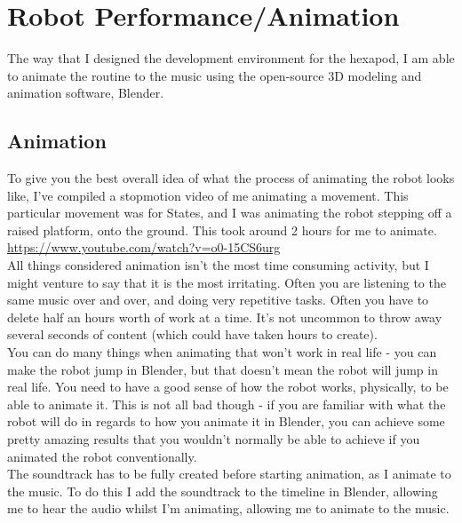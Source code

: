 	\chapter{Robot Performance/Animation}
		The way that I designed the development environment for the hexapod, I am able to animate the routine to the music using the open-source 3D modeling and animation software, Blender.\\
        
        \section{Animation}
        
          To give you the best overall idea of what the process of animating the robot looks like, I've compiled a stopmotion video of me animating a movement. This particular movement was for States, and I was animating the robot stepping off a raised platform, onto the ground. This took around 2 hours for me to animate.\\

          \url{https://www.youtube.com/watch?v=o0-15CS6urg}\\

          All things considered animation isn't the most time consuming activity, but I might venture to say that it is the most irritating. Often you are listening to the same music over and over, and doing very repetitive tasks. Often you have to delete half an hours worth of work at a time. It's not uncommon to throw away several seconds of content (which could have taken hours to create).\\

          You can do many things when animating that won't work in real life - you can make the robot jump in Blender, but that doesn't mean the robot will jump in real life. You need to have a good sense of how the robot works, physically, to be able to animate it. This is not all bad though - if you are familiar with what the robot will do in regards to how you animate it in Blender, you can achieve some pretty amazing results that you wouldn't normally be able to achieve if you animated the robot conventionally.\\

          The soundtrack has to be fully created before starting animation, as I animate to the music. To do this I add the soundtrack to the timeline in Blender, allowing me to hear the audio whilst I'm animating, allowing me to animate to the music.\\

